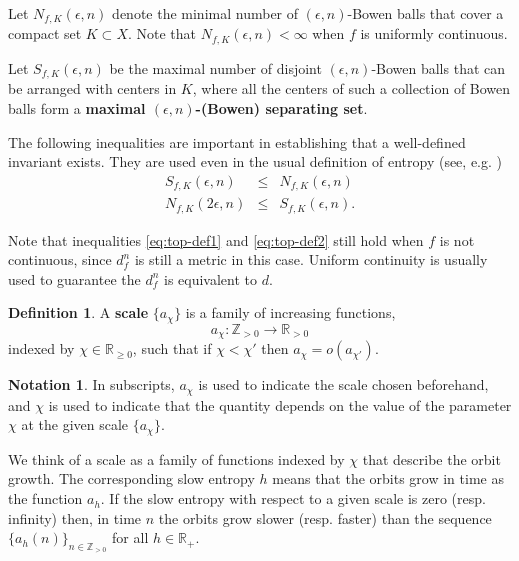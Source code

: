 \documentclass[oneside]{amsart}
\theoremstyle{plain}
\theoremstyle{definition}
\newtheorem{DEF}[THM]{Definition}
\newtheorem*{NOTN}{Notation}
\newcommand{\<}{\langle}
\renewcommand{\>}{\rangle}
\newcommand{\R}{\mathbb{R}}
\newcommand{\Z}{\mathbb{Z}}
\newcommand{\e}{\epsilon}
\renewcommand{\|}{|\!|} %
\begin{document}
Let $N_{f,K}(\e,n)$ denote the minimal number of $(\e,n)$-Bowen balls that cover a compact set $K \subset X$. Note that $N_{f,K}(\e,n) < \infty$ when $f$ is uniformly
continuous.

Let $S_{f,K}(\e,n)$ be the maximal number of disjoint $(\e,n)$-Bowen balls that can be arranged with centers in $K$, where all the centers of such a collection of Bowen balls form a \textbf{maximal $(\e,n)$-(Bowen) separating set}. 


The following inequalities are important in establishing that a well-defined invariant exists. They are used even in the usual definition of entropy (see, e.g. \cite[Section 3.1.b]{hasselblatt-katok})
\begin{eqnarray}
    S_{f,K}(\e,n) & \le & N_{f,K}(\e,n) \label{eq:top-def1}\\
    N_{f,K}(2\e,n) & \le & S_{f,K}(\e,n). \label{eq:top-def2}
\end{eqnarray}


Note that inequalities \eqref{eq:top-def1} and \eqref{eq:top-def2} still hold when $f$ is not continuous, since $d_f^n$ is still a metric in this case. Uniform continuity is usually used to guarantee the $d_f^n$ is equivalent to $d$.

\begin{DEF}
    A \textbf{scale} $\{a_\chi\}$ is a family of increasing functions, 
    \begin{equation*}
        a_\chi\colon \Z_{>0} \to \R_{>0}
    \end{equation*}
    indexed by $\chi \in \R_{\ge 0}$, such that if $\chi < \chi'$ then $a_{\chi} = o(a_{\chi'})$. 
\end{DEF}

\begin{NOTN}
    In subscripts, $a_\chi$ is used to indicate the scale chosen beforehand, and $\chi$ is used to indicate that the quantity depends on the value of the parameter $\chi$ at the given scale $\{a_\chi\}$.
\end{NOTN}



We think of a scale as a family of functions indexed by $\chi$ that describe the orbit growth. The corresponding slow entropy $h$ means that the orbits grow in time as the function $a_{h}$. If the slow entropy with respect to a given scale is zero (resp. infinity) then, in time $n$ the orbits grow slower (resp. faster) than the sequence $\{a_h(n)\}_{n \in \Z_{>0}}$ for all $h \in \R_+$.
\end{document}
